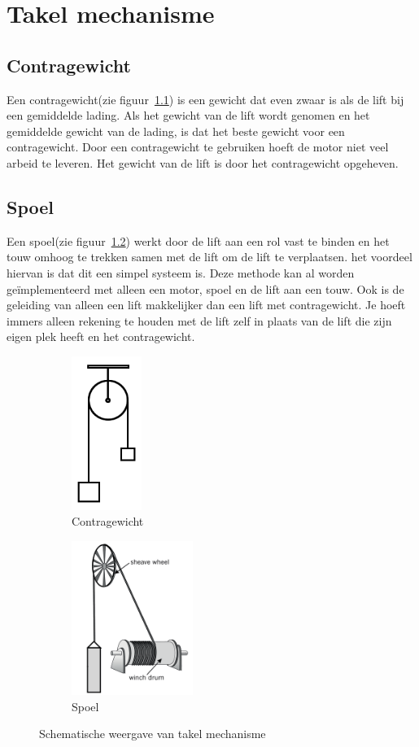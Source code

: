 \chapter{Takel mechanisme}

\section{Contragewicht}
Een contragewicht(zie figuur~\ref{fig:contragewicht}) is een gewicht dat even zwaar is als de lift bij een gemiddelde lading. Als het gewicht van de lift wordt genomen en het gemiddelde gewicht van de lading, is dat het beste gewicht voor een contragewicht. Door een contragewicht te gebruiken hoeft de motor niet veel arbeid te leveren. Het gewicht van de lift is door het contragewicht opgeheven. 

\section{Spoel}\label{sec:spoel}
Een spoel(zie figuur~\ref{fig:spoel}) werkt door de lift aan een rol vast te binden en het touw omhoog te trekken samen met de lift om de lift te verplaatsen. het voordeel hiervan is dat dit een simpel systeem is. Deze methode kan al worden geïmplementeerd met alleen een motor, spoel en de lift aan een touw. Ook is de geleiding van alleen een lift makkelijker dan een lift met contragewicht. Je hoeft immers alleen rekening te houden met de lift zelf in plaats van de lift die zijn eigen plek heeft en het contragewicht.
\\
\begin{figure}[ht]
\begin{subfigure}{0.5\textwidth}
\includegraphics[height=5cm]{src/contragewicht} 
\caption{Contragewicht}
\label{fig:contragewicht}
\end{subfigure}
\hfill
\begin{subfigure}{0.5\textwidth}
\includegraphics[height=5cm]{src/spoel}
\caption{Spoel}
\label{fig:spoel}
\end{subfigure}
\caption{Schematische weergave van takel mechanisme}
\label{fig:takel_mechanisme}
\end{figure}

